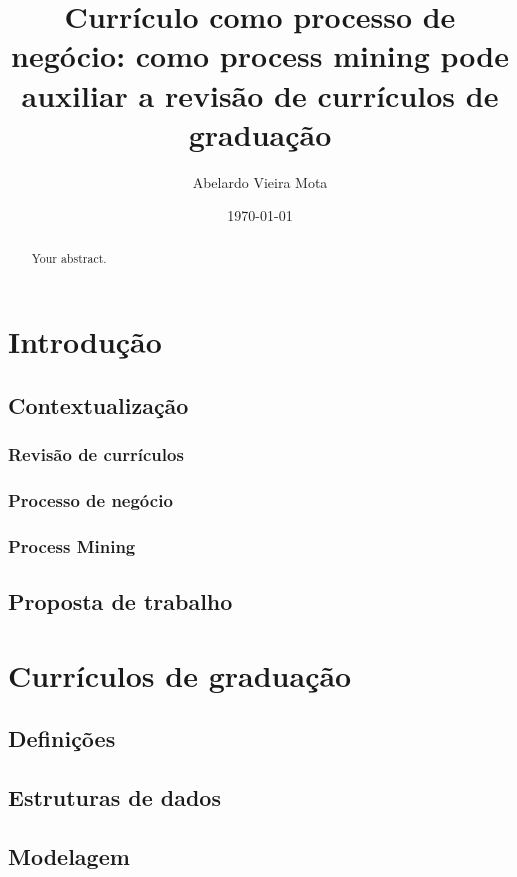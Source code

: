 \documentclass[a4paper]{article}
\title{Currículo como processo de negócio: como process mining pode auxiliar a revisão de currículos de graduação}
\author{Abelardo Vieira Mota}
\date{\today}
\begin{document}
\maketitle

\begin{abstract}
Your abstract.
\end{abstract}

\section{Introdução}

\subsection{Contextualização}
	
\subsubsection{Revisão de currículos}
\subsubsection{Processo de negócio}
\subsubsection{Process Mining}

\subsection{Proposta de trabalho}

\section{Currículos de graduação}

\subsection{Definições}

\subsection{Estruturas de dados}

\subsection{Modelagem}
\end{document}
